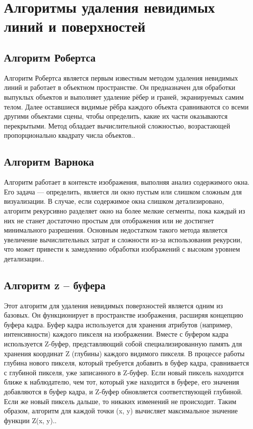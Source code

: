 \section{Алгоритмы удаления невидимых линий и поверхностей}

\subsection{Алгоритм Робертса} 

Алгоритм Робертса является первым известным методом удаления невидимых линий и работает в объектном пространстве. Он предназначен для обработки выпуклых объектов и выполняет удаление рёбер и граней, экранируемых самим телом. Далее оставшиеся видимые рёбра каждого объекта сравниваются со всеми другими объектами сцены, чтобы определить, какие их части оказываются перекрытыми. Метод обладает вычислительной сложностью, возрастающей пропорционально квадрату числа объектов.\cite{lit2}.

\subsection{Алгоритм Варнока}
Алгоритм работает в контексте изображения, выполняя анализ содержимого окна. Его задача --- определить, является ли окно пустым или слишком сложным для визуализации. В случае, если содержимое окна слишком детализировано, алгоритм рекурсивно разделяет окно на более мелкие сегменты, пока каждый из них не станет достаточно простым для отображения или не достигнет минимального разрешения. Основным недостатком такого метода является увеличение вычислительных затрат и сложности из-за использования рекурсии, что может привести к замедлению обработки изображений с высоким уровнем детализации.\cite{lit2}.

\subsection{Алгоритм z – буфера}
Этот алгоритм для удаления невидимых поверхностей является одним из базовых. Он функционирует в пространстве изображения, расширяя концепцию буфера кадра. Буфер кадра используется для хранения атрибутов (например, интенсивности) каждого пикселя на изображении. Вместе с буфером кадра используется Z-буфер, представляющий собой специализированную память для хранения координат Z (глубины) каждого видимого пикселя. В процессе работы глубина нового пикселя, который требуется добавить в буфер кадра, сравнивается с глубиной пикселя, уже записанного в Z-буфер. Если новый пиксель находится ближе к наблюдателю, чем тот, который уже находится в буфере, его значения добавляются в буфер кадра, и Z-буфер обновляется соответствующей глубиной. Если же новый пиксель дальше, то никаких изменений не происходит. Таким образом, алгоритм для каждой точки (x, y) вычисляет максимальное значение функции Z(x, y).\cite{lit2}.


